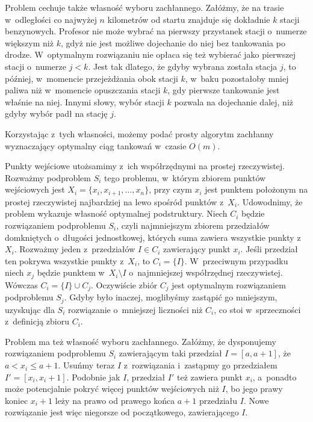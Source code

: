 Problem cechuje także własność wyboru zachłannego.
Załóżmy, że na trasie w~odległości co najwyżej $n$ kilometrów od startu znajduje się dokładnie $k$ stacji benzynowych.
Profesor nie może wybrać na pierwszy przystanek stacji o~numerze większym niż $k$, gdyż nie jest możliwe dojechanie do niej bez tankowania po drodze.
W~optymalnym rozwiązaniu nie opłaca się też wybierać jako pierwszej stacji o~numerze $j<k$.
Jest tak dlatego, że gdyby wybrana została stacja $j$, to później, w~momencie przejeżdżania obok stacji $k$, w~baku pozostałoby mniej paliwa niż w~momencie opuszczania stacji $k$, gdy pierwsze tankowanie jest właśnie na niej.
Innymi słowy, wybór stacji $k$ pozwala na dojechanie dalej, niż gdyby wybór padł na stację $j$.

Korzystając z~tych własności, możemy podać prosty algorytm zachłanny wyznaczający optymalny ciąg tankowań w~czasie $O(m)$.

\exercise %

\noindent Punkty wejściowe utożsamimy z~ich współrzędnymi na prostej rzeczywistej.
Rozważmy podproblem $S_i$ tego problemu, w~którym zbiorem punktów wejściowych jest $X_i=\{x_i,x_{i+1},\dots,x_n\}$, przy czym $x_i$ jest punktem położonym na prostej rzeczywistej najbardziej na lewo spośród punktów z~$X_i$.
Udowodnimy, że problem wykazuje własność optymalnej podstruktury.
Niech $C_i$ będzie rozwiązaniem podproblemu $S_i$, czyli najmniejszym zbiorem przedziałów domkniętych o~długości jednostkowej, których suma zawiera wszystkie punkty z~$X_i$.
Rozważmy jeden z~przedziałów $I\in C_i$ zawierający punkt $x_i$.
Jeśli przedział ten pokrywa wszystkie punkty z~$X_i$, to $C_i=\{I\}$.
W~przeciwnym przypadku niech $x_j$ będzie punktem w~$X_i\setminus I$ o~najmniejszej współrzędnej rzeczywistej.
Wówczas $C_i=\{I\}\cup C_j$.
Oczywiście zbiór $C_j$ jest optymalnym rozwiązaniem podproblemu $S_j$.
Gdyby było inaczej, moglibyśmy zastąpić go mniejszym, uzyskując dla $S_i$ rozwiązanie o~mniejszej liczności niż $C_i$, co stoi w~sprzeczności z~definicją zbioru $C_i$.

Problem ma też własność wyboru zachłannego.
Załóżmy, że dysponujemy rozwiązaniem podproblemu $S_i$ zawierającym taki przedział $I=[a,a+1]$, że $a<x_i\le a+1$.
Usuńmy teraz $I$ z~rozwiązania i~zastąpmy go przedziałem $I'=[x_i,x_i+1]$.
Podobnie jak $I$, przedział $I'$ też zawiera punkt $x_i$, a~ponadto może potencjalnie pokryć więcej punktów wejściowych niż $I$, bo jego prawy koniec $x_i+1$ leży na prawo od prawego końca $a+1$ przedziału $I$.
Nowe rozwiązanie jest więc niegorsze od początkowego, zawierającego $I$.


